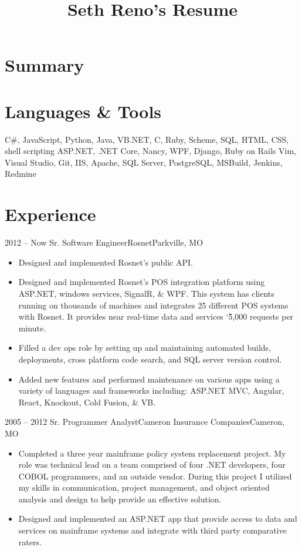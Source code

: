 \documentclass[11pt,letterpaper,final]{moderncv}
\title{Seth Reno's Resume}
\begin{document}
\maketitle
\section{Summary}

\section{Languages \& Tools} 
{C\#, JavaScript, Python, Java, VB.NET, C, Ruby, Scheme, SQL, HTML, CSS, shell scripting}
{ASP.NET, .NET Core, Nancy, WPF, Django, Ruby on Rails}
{Vim, Visual Studio, Git, IIS, Apache, SQL Server, PostgreSQL, MSBuild, Jenkins, Redmine}

\section{Experience} 
	\cventry
{2012 -- Now} {Sr. Software Engineer}{Rosnet}{Parkville, MO}{}{
		\begin{itemize}
			\item
				Designed and implemented Rosnet's public API.
			\item
				Designed and implemented Rosnet's POS integration
				platform using ASP.NET, windows services, SignalR, \&
				WPF. This system has clients running on thousands of
				machines and integrates 25 different POS systems with
				Rosnet. It provides near real-time data and services
				\char`\~5,000 requests per minute.
			\item
				Filled a dev ops role by setting up and maintaining
				automated builds, deployments, cross platform code
				search, and SQL server version control.
			\item
				Added new features and performed maintenance on various
				apps using a variety of languages and frameworks
				including: ASP.NET MVC, Angular, React, Knockout, Cold
				Fusion, \& VB.
		\end{itemize}
}
	\cventry
{2005 -- 2012} {Sr. Programmer Analyst}{Cameron Insurance Companies}{Cameron, MO}{}{
		\begin{itemize}
			\item 
				Completed a three year mainframe policy system
				replacement project. My role was technical lead on a
				team comprised of four .NET developers, four COBOL
				programmers, and an outside vendor. During this project
				I utilized my skills in communication, project
				management, and object oriented analysis and design to
				help provide an effective solution.
			\item 
				Designed and implemented an ASP.NET app that provide
				access to data and services on mainframe systems and
				integrate with third party comparative raters.
		\end{itemize}
}
\end{document}
